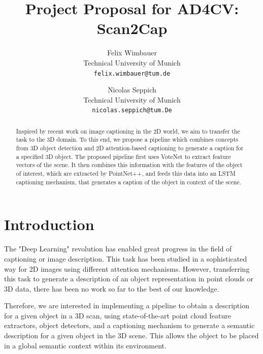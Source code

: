 \documentclass[10pt,twocolumn,letterpaper]{article}
\begin{document}
\title{Project Proposal for AD4CV: Scan2Cap}

\author{Felix Wimbauer\\
Technical University of Munich\\
{\tt\small felix.wimbauer@tum.de}
\and
Nicolas Seppich\\
Technical University of Munich\\
{\tt\small nicolas.seppich@tum.De}
}

\maketitle

\begin{abstract}
	Inspired by recent work on image captioning in the 2D world, we aim to transfer the task to the 3D domain. To this end, we propose a pipeline which combines concepts from 3D object detection and 2D attention-based captioning to generate a caption for a specified 3D object. The proposed pipeline first uses VoteNet to extract feature vectors of the scene. It then combines this information with the features of the object of interest, which are extracted by PointNet++, and feeds this data into an LSTM captioning mechanism, that generates a caption of the object in context of the scene.  
   
\end{abstract}

\section{Introduction}

The "Deep Learning" revolution has enabled great progress in the field of captioning or image description. This task has been studied in a sophisticated way for 2D images using different attention mechanisms.
However, transferring this task to generate a description of an object representation in point clouds or 3D data, there has been no work so far to the best of our knowledge.

Therefore, we are interested in implementing a pipeline to obtain a description for a given object in a 3D scan, using state-of-the-art point cloud feature extractors, object detectors, and a captioning mechanism to generate a semantic description for a given object in the 3D scene. This allows the object to be placed in a global semantic context within its environment.
 
\end{document}
